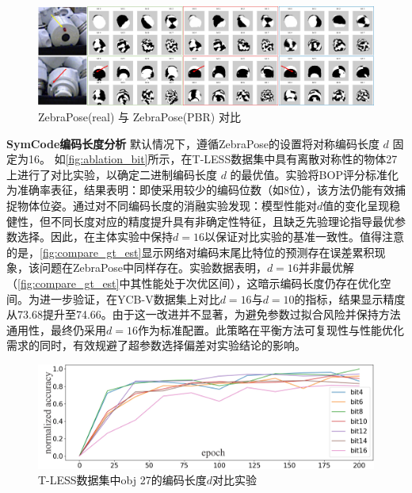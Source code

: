 \begin{figure}[ht]
        \centerline{\includegraphics[width=1.0\textwidth]{figure/symnet/vis_zebrapose_gt_real_PBR_support.jpg}}
        \caption{ZebraPose(real) 与 ZebraPose(PBR) 对比}
        \label{fig:vis_zebrapose_gt_real_PBR_support}
\end{figure}

\textbf{SymCode编码长度分析 } 默认情况下，遵循ZebraPose\cite{su2022zebrapose}的设置将对称编码长度 $d$ 固定为16。 如\autoref{fig:ablation_bit}所示，在T-LESS数据集中具有离散对称性的物体27上进行了对比实验，以确定二进制编码长度 $d$ 的最优值。实验将BOP评分标准化为准确率表征，结果表明：即使采用较少的编码位数（如8位），该方法仍能有效捕捉物体位姿。通过对不同编码长度的消融实验发现：模型性能对$d$值的变化呈现稳健性，但不同长度对应的精度提升具有非确定性特征，且缺乏先验理论指导最优参数选择。因此，在主体实验中保持$d=16$以保证对比实验的基准一致性。值得注意的是，\autoref{fig:compare_gt_est}显示网络对编码末尾比特位的预测存在误差累积现象，该问题在ZebraPose中同样存在。实验数据表明，$d=16$并非最优解（\autoref{fig:compare_gt_est}中其性能处于次优区间），这暗示编码长度仍存在优化空间。为进一步验证，在YCB-V数据集上对比$d=16$与$d=10$的指标，结果显示精度从73.68提升至74.66。由于这一改进并不显著，为避免参数过拟合风险并保持方法通用性，最终仍采用$d=16$作为标准配置。此策略在平衡方法可复现性与性能优化需求的同时，有效规避了超参数选择偏差对实验结论的影响。

\begin{figure}[ht]
        \centerline{\includegraphics[width=1.0\textwidth]{figure/symnet/ablation_bit.jpg}}
        \caption{T-LESS数据集中obj 27的编码长度$d$对比实验}
        \label{fig:ablation_bit}
\end{figure}

